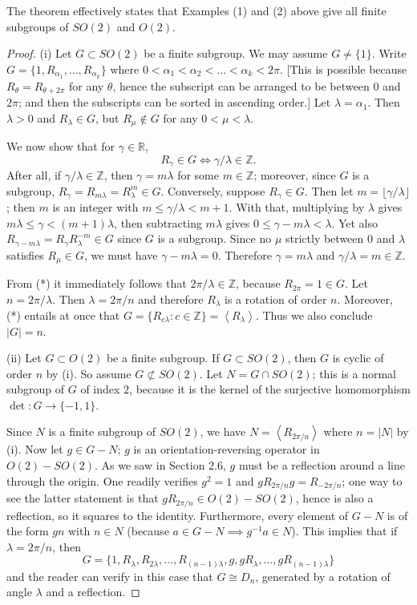 \documentclass[leqno]{book}
\begin{document}
\noindent The theorem effectively states that Examples (1) and (2) above give all finite subgroups of $SO(2)$ and $O(2)$.
\begin{proof}
(i) Let $G\subset SO(2)$ be a finite subgroup.  We may assume $G\ne\{1\}$.  Write $G=\{1,R_{\alpha_1},\dots,R_{\alpha_k}\}$ where $0<\alpha_1<\alpha_2<\dots<\alpha_k<2\pi$.  [This is possible because $R_\theta=R_{\theta+2\pi}$ for any $\theta$, hence the subscript can be arranged to be between $0$ and $2\pi$; and then the subscripts can be sorted in ascending order.]  Let $\lambda=\alpha_1$.  Then $\lambda>0$ and $R_\lambda\in G$, but $R_\mu\notin G$ for any $0<\mu<\lambda$.

We now show that for $\gamma\in\mathbb R$,
\begin{equation}\tag{*}
R_\gamma\in G\iff\gamma/\lambda\in\mathbb Z.
\end{equation}
After all, if $\gamma/\lambda\in\mathbb Z$, then $\gamma=m\lambda$ for some $m\in\mathbb Z$; moreover, since $G$ is a subgroup, $R_\gamma=R_{m\lambda}=R_\lambda^m\in G$.  Conversely, suppose $R_\gamma\in G$.  Then let $m=\lfloor\gamma/\lambda\rfloor$; then $m$ is an integer with $m\leqslant\gamma/\lambda<m+1$.  With that, multiplying by $\lambda$ gives $m\lambda\leqslant\gamma<(m+1)\lambda$, then subtracting $m\lambda$ gives $0\leqslant\gamma-m\lambda<\lambda$.  Yet also $R_{\gamma-m\lambda}=R_\gamma R_\lambda^{-m}\in G$ since $G$ is a subgroup.  Since no $\mu$ strictly between $0$ and $\lambda$ satisfies $R_\mu\in G$, we must have $\gamma-m\lambda=0$.  Therefore $\gamma=m\lambda$ and $\gamma/\lambda=m\in\mathbb Z$.

From (*) it immediately follows that $2\pi/\lambda\in\mathbb Z$, because $R_{2\pi}=1\in G$.  Let $n=2\pi/\lambda$.  Then $\lambda=2\pi/n$ and therefore $R_\lambda$ is a rotation of order $n$.  Moreover, (*) entails at once that $G=\{R_{c\lambda}:c\in\mathbb Z\}=\left<R_\lambda\right>$.  Thus we also conclude $|G|=n$.

(ii) Let $G\subset O(2)$ be a finite subgroup.  If $G\subset SO(2)$, then $G$ is cyclic of order $n$ by (i).  So assume $G\not\subset SO(2)$.  Let $N=G\cap SO(2)$; this is a normal subgroup of $G$ of index $2$, because it is the kernel of the surjective homomorphism $\det:G\to\{-1,1\}$.

Since $N$ is a finite subgroup of $SO(2)$, we have $N=\left<R_{2\pi/n}\right>$ where $n=|N|$ by (i).  Now let $g\in G-N$; $g$ is an orientation-reversing operator in $O(2)-SO(2)$.  As we saw in Section 2.6, $g$ must be a reflection around a line through the origin.  One readily verifies $g^2=1$ and $gR_{2\pi/n}g=R_{-2\pi/n}$; one way to see the latter statement is that $gR_{2\pi/n}\in O(2)-SO(2)$, hence is also a reflection, so it squares to the identity.  Furthermore, every element of $G-N$ is of the form $gn$ with $n\in N$ (because $a\in G-N\implies g^{-1}a\in N$).  This implies that if $\lambda=2\pi/n$, then
$$G=\{1,R_\lambda,R_{2\lambda},\dots,R_{(n-1)\lambda},g,gR_\lambda,\dots,gR_{(n-1)\lambda}\}$$
and the reader can verify in this case that $G\cong D_n$, generated by a rotation of angle $\lambda$ and a reflection.
\end{proof}
\end{document}
